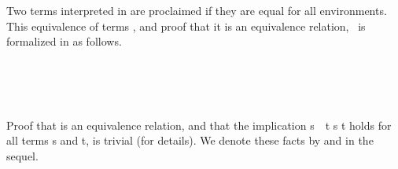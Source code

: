 Two terms interpreted in  are proclaimed  if they are equal for all
environments.  This equivalence of terms%
\ifshort\else
, and proof that it is an equivalence relation,
\fi
~is formalized in \agda as follows.

\begin{code}%
\>[0]\<%
\\
\>[0][@{}l@{\AgdaIndent{1}}]%
\>[1]\AgdaSpace{}%
\AgdaSymbol{:}\AgdaSpace{}%
\AgdaSymbol{\{}\AgdaSpace{}%
\AgdaSymbol{:}\AgdaSpace{}%
\AgdaSpace{}%
\AgdaSymbol{\}(}\AgdaSpace{}%
\AgdaSpace{}%
\AgdaSymbol{:}\AgdaSpace{}%
\AgdaSpace{}%
\AgdaSymbol{)}\AgdaSpace{}%
\AgdaSpace{}%
\AgdaSpace{}%
\AgdaSymbol{\AgdaUnderscore{}}\<%
\\
%
\>[1]\AgdaSpace{}%
\AgdaSymbol{\{}\AgdaSpace{}%
\AgdaSymbol{=}\AgdaSpace{}%
\AgdaSymbol{\}}\AgdaSpace{}%
\AgdaSpace{}%
\AgdaSpace{}%
\AgdaSymbol{=}\AgdaSpace{}%
\AgdaSpace{}%
\AgdaSymbol{(}\AgdaSpace{}%
\AgdaSymbol{:}\AgdaSpace{}%
\AgdaSpace{}%
\AgdaSymbol{(}\AgdaSpace{}%
\AgdaSymbol{))}\AgdaSpace{}%
\AgdaSpace{}%
\AgdaSpace{}%
\AgdaSpace{}%
\AgdaSpace{}%
\AgdaSpace{}%
\AgdaSpace{}%
\AgdaSpace{}%
\AgdaSpace{}%
\AgdaSpace{}%
\AgdaSpace{}%
\AgdaSpace{}%
\<%
\\
\>[0]\<%
\end{code}
\ifshort
Proof that  is an equivalence relation, and that the implication \ab
s~~\ab t   \ab s \ab t holds for all terms \ab s and \ab t, is
trivial (\seeshort for details).
We denote these facts by  and  in the sequel.
\else
